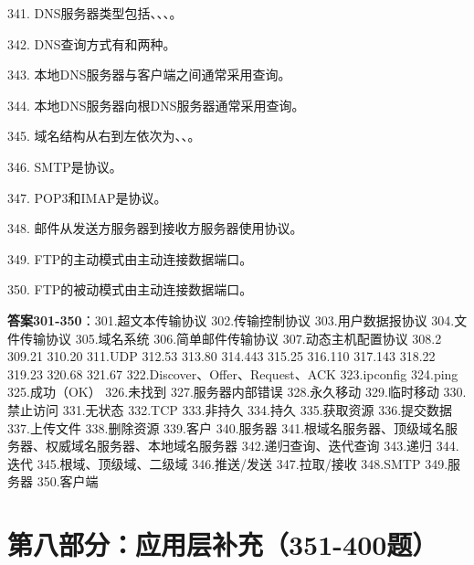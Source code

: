 341. DNS服务器类型包括\underline{\hspace{2cm}}、\underline{\hspace{2cm}}、\underline{\hspace{2cm}}、\underline{\hspace{2cm}}。

342. DNS查询方式有\underline{\hspace{2cm}}和\underline{\hspace{2cm}}两种。

343. 本地DNS服务器与客户端之间通常采用\underline{\hspace{2cm}}查询。

344. 本地DNS服务器向根DNS服务器通常采用\underline{\hspace{2cm}}查询。

345. 域名结构从右到左依次为\underline{\hspace{2cm}}、\underline{\hspace{2cm}}、\underline{\hspace{2cm}}。

346. SMTP是\underline{\hspace{2cm}}协议。

347. POP3和IMAP是\underline{\hspace{2cm}}协议。

348. 邮件从发送方服务器到接收方服务器使用\underline{\hspace{2cm}}协议。

349. FTP的主动模式由\underline{\hspace{2cm}}主动连接数据端口。

350. FTP的被动模式由\underline{\hspace{2cm}}主动连接数据端口。

\textbf{答案301-350}：301.超文本传输协议 302.传输控制协议 303.用户数据报协议 304.文件传输协议 305.域名系统 306.简单邮件传输协议 307.动态主机配置协议 308.2 309.21 310.20 311.UDP 312.53 313.80 314.443 315.25 316.110 317.143 318.22 319.23 320.68 321.67 322.Discover、Offer、Request、ACK 323.ipconfig 324.ping 325.成功（OK） 326.未找到 327.服务器内部错误 328.永久移动 329.临时移动 330.禁止访问 331.无状态 332.TCP 333.非持久 334.持久 335.获取资源 336.提交数据 337.上传文件 338.删除资源 339.客户 340.服务器 341.根域名服务器、顶级域名服务器、权威域名服务器、本地域名服务器 342.递归查询、迭代查询 343.递归 344.迭代 345.根域、顶级域、二级域 346.推送/发送 347.拉取/接收 348.SMTP 349.服务器 350.客户端


\section{第八部分：应用层补充（351-400题）}

